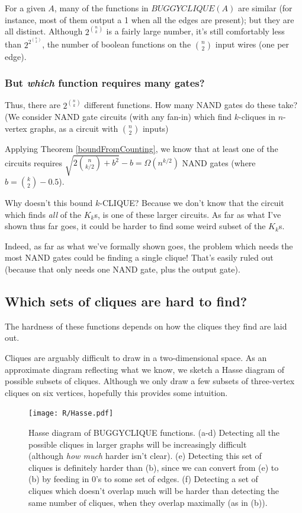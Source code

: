 \documentclass[12pt]{article}
\theoremstyle{definition}
\begin{document}
For a given $A$, many of the functions in $BUGGYCLIQUE(A)$
are similar (for instance, most
of them output a 1 when all the edges are present);
but they are all distinct.
Although $2^{n \choose k}$ is a fairly large number,
it's still comfortably less than $2^{2^{n \choose 2}}$, the number of boolean
functions on the ${n \choose 2}$ input wires (one per edge).

\subsubsection{But {\em which} function requires many gates?}

Thus, there are $2^{n \choose k}$ different functions. 
How many NAND gates do these take?
(We consider NAND gate circuits (with any fan-in) which find $k$-cliques in $n$-vertex
graphs, as a circuit with $n \choose 2$ inputs)

Applying Theorem
\ref{boundFromCounting}, we know that at least one of the circuits requires
${\sqrt {2 {n \choose {k/2}} + b^2}} - b = \Omega(n^{k/2})$ 
NAND gates (where $b = {k \choose 2} - 0.5$).

Why doesn't this bound $k$-CLIQUE?
Because we don't know that the circuit which finds {\em all} of the
$K_k$s, is one of these larger circuits. As far as what I've
shown thus far goes, it could be harder to find some weird subset of the $K_k$s.

Indeed, as far as what we've formally shown goes, the problem which needs
the most NAND gates could be finding a single clique! That's easily ruled out
(because that only needs one NAND gate, plus the output gate).

\subsection{Which sets of cliques are hard to find?}
\label{sec:whichCliques}

The hardness of these functions depends
on how the cliques they find are laid out.

Cliques are arguably difficult to draw in a two-dimensional space.
As an approximate diagram reflecting what we know,
we sketch a Hasse diagram of possible subsets of cliques. Although
we only draw a few subsets of three-vertex cliques
on six vertices, hopefully this provides some
intuition.

\begin{figure}
\centering
\texttt{[image: R/Hasse.pdf]}
\caption{Hasse diagram of BUGGYCLIQUE functions.
(a-d) 
Detecting all the possible cliques in larger graphs will be
increasingly difficult (although {\em how much} harder isn't clear).
(e) 
Detecting this set of cliques is definitely harder than (b),
since we can convert from (e) to (b) by feeding in 0's to
some set of edges.
(f) Detecting a set of cliques which doesn't overlap much will be
harder than detecting the same number of cliques, when they overlap
maximally (as in (b)).}
\label{fig:Hasse}
\end{figure}
\end{document}
